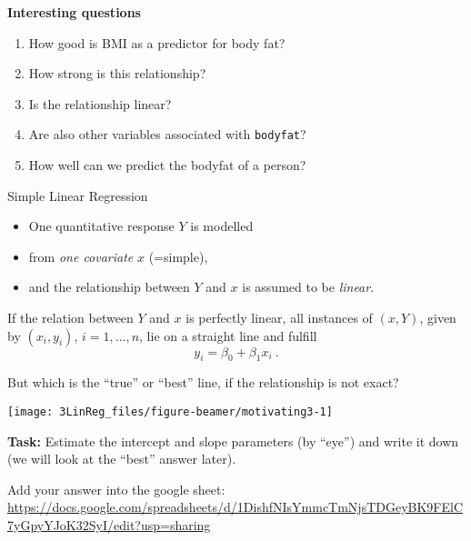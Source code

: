 \documentclass[10pt,ignorenonframetext,]{beamer}
\providecommand{\tightlist}{%
  \setlength{\itemsep}{0pt}\setlength{\parskip}{0pt}}
\begin{document}
\begin{frame}[fragile]

\textbf{Interesting questions}

\begin{enumerate}
\tightlist
\item
  How good is BMI as a predictor for body fat?
\item
  How strong is this relationship?
\item
  Is the relationship linear?
\item
  Are also other variables associated with \texttt{bodyfat}?
\item
  How well can we predict the bodyfat of a person?
\end{enumerate}

\end{frame}

\begin{frame}{Simple Linear Regression}
\protect\hypertarget{simple-linear-regression}{}

\begin{itemize}
\item
  One quantitative response \(Y\) is modelled
\item
  from \emph{one covariate} \(x\) (=simple),
\item
  and the relationship between \(Y\) and \(x\) is assumed to be
  \emph{linear}.
\end{itemize}

\vspace{6mm}

If the relation between \(Y\) and \(x\) is perfectly linear, all
instances of \((x,Y)\), given by \((x_i,y_i)\), \(i= 1,\ldots, n\), lie
on a straight line and fulfill \[y_i = \beta_0 + \beta_1 x_i\ .\]

\end{frame}

\begin{frame}

But which is the ``true'' or ``best'' line, if the relationship is not
exact?

\begin{center}\texttt{[image: 3LinReg\_files/figure-beamer/motivating3-1]} \end{center}

\textbf{Task:} Estimate the intercept and slope parameters (by ``eye'')
and write it down (we will look at the ``best'' answer later).

Add your answer into the google sheet:
\url{https://docs.google.com/spreadsheets/d/1DishfNIsYmmcTmNjsTDGeyBK9FElC7yGpyYJoK32SyI/edit?usp=sharing}

\end{frame}
\end{document}
